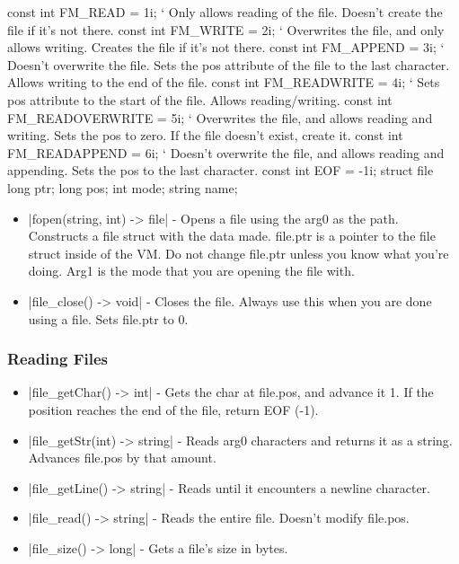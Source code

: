 \documentclass[12pt, letterpaper, oneside]{article}
\begin{document}
		
		\begin{spverbatim}
			const int FM_READ = 1i; ` Only allows reading of the file. Doesn't create the file if it's not there.
			const int FM_WRITE = 2i; ` Overwrites the file, and only allows writing. Creates the file if it's not there.
			const int FM_APPEND = 3i; ` Doesn't overwrite the file. Sets the pos attribute of the file to the last character. Allows writing to the end of the file.
			const int FM_READWRITE = 4i; ` Sets pos attribute to the start of the file. Allows reading/writing.
			const int FM_READOVERWRITE = 5i; ` Overwrites the file, and allows reading and writing. Sets the pos to zero. If the file doesn't exist, create it. 
			const int FM_READAPPEND = 6i; ` Doesn't overwrite the file, and allows reading and appending. Sets the pos to the last character.
			const int EOF = -1i;
			struct file {
				long ptr;
				long pos;
				int mode;
				string name;
			}
			
		\end{spverbatim}
		\begin{itemize}
			\item[--] \spverb|fopen(string, int) -> file| - Opens a file using the arg0 as the path. Constructs a file struct with the data made. file.ptr is a pointer to the file struct inside of the VM. Do not change file.ptr unless you know what you're doing. Arg1 is the mode that you are opening the file with.
			\item[--] \spverb|file_close() -> void| - Closes the file. Always use this when you are done using a file. Sets file.ptr to 0.
		\end{itemize}
	\subsubsection{Reading Files}
		\begin{itemize}
			\item[--] \spverb|file_getChar() -> int| - Gets the char at file.pos, and advance it 1. If the position reaches the end of the file, return EOF (-1).
			\item[--] \spverb|file_getStr(int) -> string| - Reads arg0 characters and returns it as a string. Advances file.pos by that amount.
			\item[--] \spverb|file_getLine() -> string| - Reads until it encounters a newline character.
			\item[--] \spverb|file_read() -> string| - Reads the entire file. Doesn't modify file.pos.
			\item[--] \spverb|file_size() -> long| - Gets a file's size in bytes.
		\end{itemize}
\end{document}
